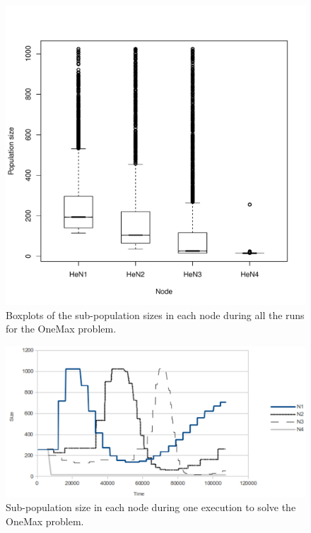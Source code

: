 \begin{figure}
\centering
\includegraphics[scale =0.4] {gfx/adaptiveresults/sizesONEMAX.pdf}
\caption{Boxplots of the sub-population sizes in each node during all the runs for the OneMax problem.}
\label{fig:sizesONEMAX}
\end{figure}

\begin{figure}
\centering
\includegraphics[scale =0.4] {gfx/adaptiveresults/sizesONEMAX1ejec.pdf}
\caption{Sub-population size in each node during one execution to solve the OneMax problem.}
\label{fig:sizesONEMAX1ejec}
\end{figure}


